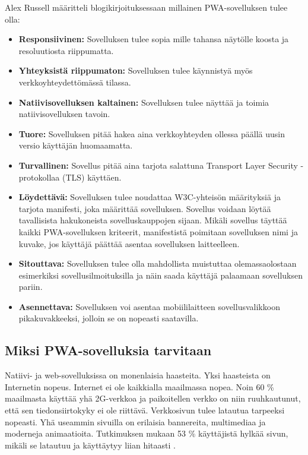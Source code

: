 \documentclass{tktltiki}
\begin{document}
Alex Russell määritteli blogikirjoituksessaan \cite{Russell} millainen PWA-sovelluksen tulee olla: 

\begin{itemize}
  \item \textbf{Responsiivinen:} Sovelluksen tulee sopia mille tahansa näytölle koosta ja resoluutiosta riippumatta.
  \item \textbf{Yhteyksistä riippumaton:} Sovelluksen tulee käynnistyä myös verkkoyhteydettömässä tilassa.
  \item \textbf{Natiivisovelluksen kaltainen:} Sovelluksen tulee näyttää ja toimia natiivisovelluksen tavoin.
  \item \textbf{Tuore:} Sovelluksen pitää hakea aina verkkoyhteyden ollessa päällä uusin versio käyttäjän huomaamatta.
  \item \textbf{Turvallinen:} Sovellus pitää aina tarjota salattuna Transport Layer Security -protokollaa (TLS) käyttäen.
  \item \textbf{Löydettävä:} Sovelluksen tulee noudattaa W3C-yhteisön määrityksiä ja tarjota manifesti, joka määrittää sovelluksen. Sovellus voidaan löytää tavallisista hakukoneista sovelluskauppojen sijaan. Mikäli sovellus täyttää kaikki PWA-sovelluksen kriteerit, manifestistä poimitaan sovelluksen nimi ja kuvake, jos käyttäjä päättää asentaa sovelluksen laitteelleen.
  \item \textbf{Sitouttava:} Sovelluksen tulee olla mahdollista muistuttaa olemassaolostaan esimerkiksi sovellusilmoituksilla ja näin saada käyttäjä palaamaan sovelluksen pariin.
  \item \textbf{Asennettava:} Sovelluksen voi asentaa mobiililaitteen sovellusvalikkoon pikakuvakkeeksi, jolloin se on nopeasti saatavilla.
\end{itemize}

\subsection{Miksi PWA-sovelluksia tarvitaan}
\enlargethispage{5mm}

Natiivi- ja web-sovelluksissa on monenlaisia haasteita. Yksi haasteista on Internetin nopeus. Internet ei ole kaikkialla maailmassa nopea. Noin 60 \% maailmasta käyttää yhä 2G-verkkoa \cite{Kapoor} ja paikoitellen verkko on niin ruuhkautunut, että sen tiedonsiirtokyky ei ole riittävä. Verkkosivun tulee latautua tarpeeksi nopeasti. Yhä useammin sivuilla on erilaisia bannereita, multimediaa ja moderneja animaatioita. Tutkimuksen mukaan 53 \% käyttäjistä hylkää sivun, mikäli se latautuu ja käyttäytyy liian hitaasti \cite{Kapoor}.
\end{document}
